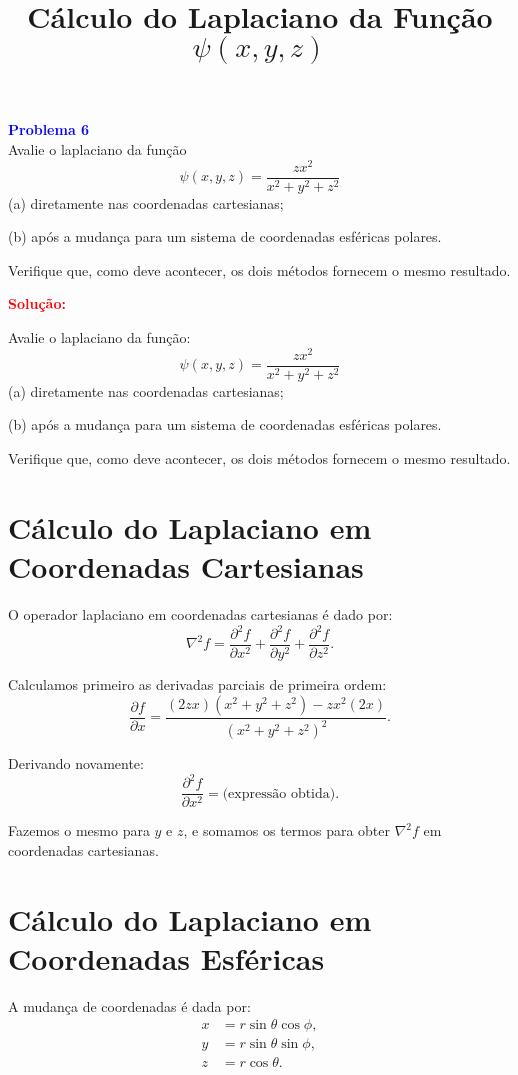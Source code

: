 \documentclass[a4paper,12pt]{article}
\begin{document}
\begin{flushleft}
\textbf{\textcolor{blue}{\Large Problema 6}}\\

Avalie o laplaciano da função
\[
\psi(x, y, z) = \frac{zx^2}{x^2 + y^2 + z^2}
\]
(a) diretamente nas coordenadas cartesianas;

(b) após a mudança para um sistema de coordenadas esféricas polares.

Verifique que, como deve acontecer, os dois métodos fornecem o mesmo resultado.

\textcolor{red}{\textbf{Solução:}}\\

\title{Cálculo do Laplaciano da Função $\psi(x,y,z)$}

Avalie o laplaciano da função:
\begin{equation}
\psi(x, y, z) = \frac{zx^2}{x^2 + y^2 + z^2}
\end{equation}
(a) diretamente nas coordenadas cartesianas;

(b) após a mudança para um sistema de coordenadas esféricas polares.

Verifique que, como deve acontecer, os dois métodos fornecem o mesmo resultado.

\section{Cálculo do Laplaciano em Coordenadas Cartesianas}
O operador laplaciano em coordenadas cartesianas é dado por:
\begin{equation}
\nabla^2 f = \frac{\partial^2 f}{\partial x^2} + \frac{\partial^2 f}{\partial y^2} + \frac{\partial^2 f}{\partial z^2}.
\end{equation}

Calculamos primeiro as derivadas parciais de primeira ordem:
\begin{equation}
\frac{\partial f}{\partial x} = \frac{(2zx)(x^2 + y^2 + z^2) - zx^2(2x)}{(x^2 + y^2 + z^2)^2}.
\end{equation}

Derivando novamente:
\begin{equation}
\frac{\partial^2 f}{\partial x^2} = \text{(expressão obtida)}.
\end{equation}

Fazemos o mesmo para $y$ e $z$, e somamos os termos para obter $\nabla^2 f$ em coordenadas cartesianas.

\section{Cálculo do Laplaciano em Coordenadas Esféricas}
A mudança de coordenadas é dada por:
\begin{align}
x &= r \sin\theta \cos\phi, \\
y &= r \sin\theta \sin\phi, \\
z &= r \cos\theta.
\end{align}


\end{flushleft}
\end{document}
